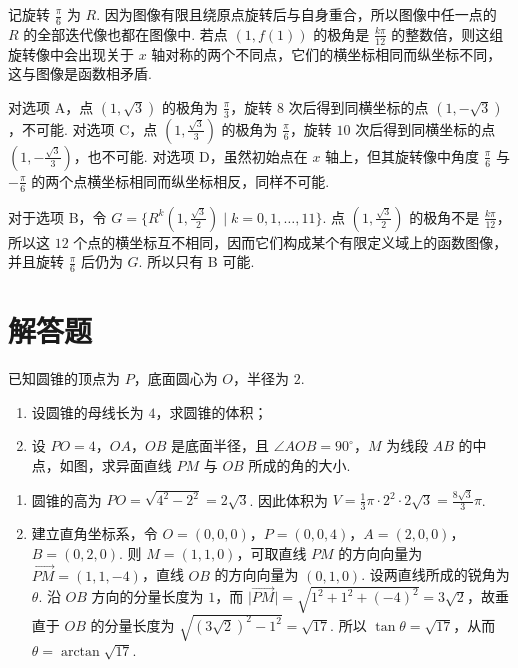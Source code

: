\begin{solution}
记旋转 \(\frac\pi6\) 为 \(R\). 因为图像有限且绕原点旋转后与自身重合，所以图像中任一点的 \(R\) 的全部迭代像也都在图像中. 若点 \((1,f(1))\) 的极角是 \(\frac{k\pi}{12}\) 的整数倍，则这组旋转像中会出现关于 \(x\) 轴对称的两个不同点，它们的横坐标相同而纵坐标不同，这与图像是函数相矛盾.

对选项 A，点 \((1,\sqrt3)\) 的极角为 \(\frac\pi3\)，旋转 \(8\) 次后得到同横坐标的点 \((1,-\sqrt3)\)，不可能. 对选项 C，点 \((1,\frac{\sqrt3}{3})\) 的极角为 \(\frac\pi6\)，旋转 \(10\) 次后得到同横坐标的点 \((1,-\frac{\sqrt3}{3})\)，也不可能. 对选项 D，虽然初始点在 \(x\) 轴上，但其旋转像中角度 \(\frac\pi6\) 与 \(-\frac\pi6\) 的两个点横坐标相同而纵坐标相反，同样不可能.

对于选项 B，令 \(G=\{R^k(1,\frac{\sqrt3}{2})\mid k=0,1,\ldots,11\}\). 点 \((1,\frac{\sqrt3}{2})\) 的极角不是 \(\frac{k\pi}{12}\)，所以这 \(12\) 个点的横坐标互不相同，因而它们构成某个有限定义域上的函数图像，并且旋转 \(\frac\pi6\) 后仍为 \(G\). 所以只有 B 可能.
\end{solution}

\section{解答题}

\begin{problem}
已知圆锥的顶点为 \(P\)，底面圆心为 \(O\)，半径为 \(2\).

\begin{enumerate}
\item 设圆锥的母线长为 \(4\)，求圆锥的体积；
\item 设 \(PO=4\)，\(OA\)，\(OB\) 是底面半径，且 \(\angle AOB=90^\circ\)，\(M\) 为线段 \(AB\) 的中点，如图，求异面直线 \(PM\) 与 \(OB\) 所成的角的大小.
\end{enumerate}

\end{problem}

\begin{solution}
\begin{enumerate}
\item 圆锥的高为 \(PO=\sqrt{4^2-2^2}=2\sqrt3\). 因此体积为 \(V=\frac13\pi\cdot2^2\cdot2\sqrt3=\frac{8\sqrt3}{3}\pi\).
\item 建立直角坐标系，令 \(O=(0,0,0)\)，\(P=(0,0,4)\)，\(A=(2,0,0)\)，\(B=(0,2,0)\). 则 \(M=(1,1,0)\)，可取直线 \(PM\) 的方向向量为 \(\overrightarrow{PM}=(1,1,-4)\)，直线 \(OB\) 的方向向量为 \((0,1,0)\). 设两直线所成的锐角为 \(\theta\). 沿 \(OB\) 方向的分量长度为 \(1\)，而 \(\lvert\overrightarrow{PM}\rvert=\sqrt{1^2+1^2+(-4)^2}=3\sqrt2\)，故垂直于 \(OB\) 的分量长度为 \(\sqrt{(3\sqrt2)^2-1^2}=\sqrt{17}\). 所以 \(\tan\theta=\sqrt{17}\)，从而 \(\theta=\arctan\sqrt{17}\).
\end{enumerate}
\end{solution}

